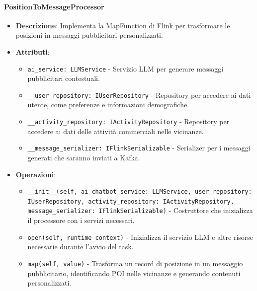 \documentclass[10pt]{article}
\begin{document}
    \paragraph{PositionToMessageProcessor}
    \begin{itemize}
        \item \textbf{Descrizione}: Implementa la MapFunction di Flink per trasformare le posizioni in messaggi pubblicitari personalizzati.
        \item \textbf{Attributi}:
        \begin{itemize}
            \item \texttt{ai\_service: LLMService} - Servizio LLM per generare messaggi pubblicitari contestuali.
            \item \texttt{\_\_user\_repository: IUserRepository} - Repository per accedere ai dati utente, come preferenze e informazioni demografiche.
            \item \texttt{\_\_activity\_repository: IActivityRepository} - Repository per accedere ai dati delle attività commerciali nelle vicinanze.
            \item \texttt{\_\_message\_serializer: IFlinkSerializable} - Serializer per i messaggi generati che saranno inviati a Kafka.
        \end{itemize}
        \item \textbf{Operazioni}:
        \begin{itemize}
            \item \texttt{\_\_init\_\_(self, ai\_chatbot\_service: LLMService, user\_repository: IUserRepository, activity\_repository: IActivityRepository, message\_serializer: IFlinkSerializable)} - Costruttore che inizializza il processore con i servizi necessari.
            \item \texttt{open(self, runtime\_context)} - Inizializza il servizio LLM e altre risorse necessarie durante l'avvio del task.
            \item \texttt{map(self, value)} - Trasforma un record di posizione in un messaggio pubblicitario, identificando POI nelle vicinanze e generando contenuti personalizzati.
        \end{itemize}
    \end{itemize}
\end{document}
